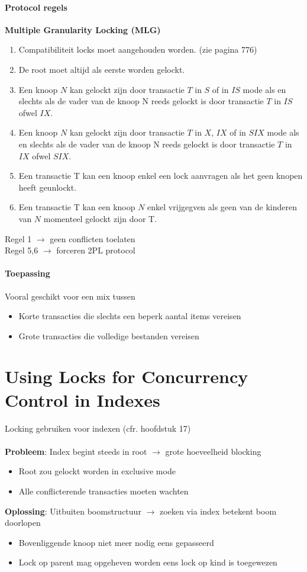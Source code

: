 \paragraph{Protocol regels} \textbf{Multiple Granularity Locking (MLG)}
\begin{enumerate}
	\item Compatibiliteit locks moet aangehouden worden. (zie pagina 776)
	\item De root moet altijd als eerste worden gelockt.
	\item Een knoop $N$ kan gelockt zijn door transactie $T$ in $S$ of in $IS$ mode als en slechts als de vader van de knoop N reeds gelockt is door transactie $T$ in $IS$ ofwel $IX$.
	\item Een knoop $N$ kan gelockt zijn door transactie $T$ in $X$, $IX$ of in $SIX$ mode als en slechts als de vader van de knoop N reeds gelockt is door transactie $T$ in $IX$ ofwel $SIX$.
	\item Een transactie T kan een knoop enkel een lock aanvragen als het geen knopen heeft geunlockt. 
	\item Een transactie T kan een knoop $N$ enkel vrijgegven als geen van de kinderen van $N$ momenteel gelockt zijn door T.
\end{enumerate}
Regel 1 $\rightarrow$ geen conflicten toelaten \\ 
Regel 5,6 $\rightarrow$ forceren 2PL protocol
\paragraph{Toepassing}
Vooral geschikt voor een mix tussen
\begin{itemize}
	\item Korte transacties die slechts een beperk aantal items vereisen
	\item Grote transacties die volledige bestanden vereisen
\end{itemize}



\section{Using Locks for Concurrency Control in Indexes}%
Locking gebruiken voor indexen (cfr. hoofdstuk 17)\\\\
\textbf{Probleem}: Index begint steeds in root $\rightarrow$ grote hoeveelheid blocking
\begin{itemize}
	\item Root zou gelockt worden in exclusive mode
	\item Alle conflicterende transacties moeten wachten
\end{itemize}
\textbf{Oplossing}: Uitbuiten boomstructuur $\rightarrow$ zoeken via index betekent boom doorlopen
\begin{itemize}
	\item Bovenliggende knoop niet meer nodig eens gepasseerd
	\item Lock op parent mag opgeheven worden eens lock op kind is toegewezen
\end{itemize} 
